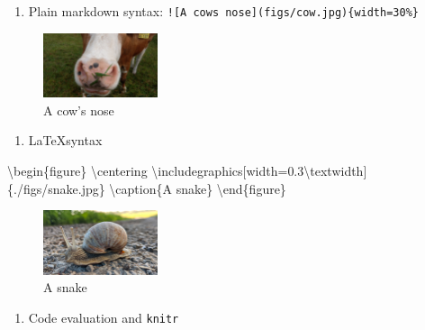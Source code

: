 \documentclass[
  11pt,
]{scrartcl}
\newenvironment{Shaded}{\begin{snugshade}}{\end{snugshade}}
\newcommand{\FloatTok}[1]{\textcolor[rgb]{0.00,0.00,0.81}{#1}}
\newcommand{\NormalTok}[1]{#1}
\newcommand{\OtherTok}[1]{\textcolor[rgb]{0.56,0.35,0.01}{#1}}
\newcommand{\SpecialCharTok}[1]{\textcolor[rgb]{0.00,0.00,0.00}{#1}}
\providecommand{\tightlist}{%
  \setlength{\itemsep}{0pt}\setlength{\parskip}{0pt}}
\begin{document}
\begin{enumerate}
\def\labelenumi{\arabic{enumi}.}
\tightlist
\item
  Plain markdown syntax: \texttt{!{[}A\ cow\textquotesingle{}s\ nose{]}(figs/cow.jpg)\{width=30\%\}}
\end{enumerate}

\begin{figure}
\centering
\includegraphics[width=0.3\textwidth,height=\textheight]{figs/cow.jpg}
\caption{A cow's nose}
\end{figure}

\begin{enumerate}
\def\labelenumi{\arabic{enumi}.}
\setcounter{enumi}{1}
\tightlist
\item
  \LaTeX syntax
\end{enumerate}

\begin{Shaded}
\begin{Highlighting}[]
\NormalTok{\textbackslash{}begin\{figure\}}
\NormalTok{\textbackslash{}centering}
\NormalTok{\textbackslash{}includegraphics[width}\OtherTok{=}\FloatTok{0.3}\NormalTok{\textbackslash{}textwidth]\{.}\SpecialCharTok{/}\NormalTok{figs}\SpecialCharTok{/}\NormalTok{snake.jpg\}}
\NormalTok{\textbackslash{}caption\{A snake\}}
\NormalTok{\textbackslash{}end\{figure\}}
\end{Highlighting}
\end{Shaded}

\begin{figure}
\centering
\includegraphics[width=0.3\textwidth]{./figs/snake.jpg}
\caption{A snake}
\end{figure}

\begin{enumerate}
\def\labelenumi{\arabic{enumi}.}
\setcounter{enumi}{2}
\tightlist
\item
  Code evaluation and \texttt{knitr}
\end{enumerate}
\end{document}
